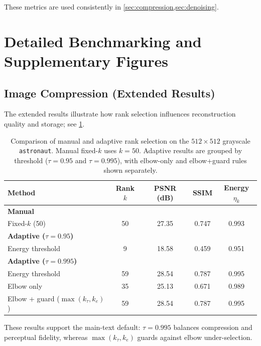 \documentclass[11pt,a4paper]{article}
\begin{document}
These metrics are used consistently in \cref{sec:compression,sec:denoising}.

\section{Detailed Benchmarking and Supplementary Figures}
\label{sec:appendix-bench}

\subsection{Image Compression (Extended Results)}
\label{sec:appendix-compression}

The extended results illustrate how rank selection influences reconstruction quality and storage; see \cref{tab:compression_summary}.



\begin{table}[t]
\centering
\caption{Comparison of manual and adaptive rank selection on the $512\times512$ grayscale \texttt{astronaut}. 
Manual fixed-$k$ uses $k=50$. 
Adaptive results are grouped by threshold ($\tau=0.95$ and $\tau=0.995$), with elbow-only and elbow+guard rules shown separately.}
\label{tab:compression_summary}
\begin{tabular}{lcccc}
\toprule
\textbf{Method} & \textbf{Rank $k$} & \textbf{PSNR (dB)} & \textbf{SSIM} & \textbf{Energy $\eta_k$} \\
\midrule
\multicolumn{5}{l}{\textbf{Manual}} \\
Fixed-$k$ (50)              & 50 & 27.35 & 0.747 & 0.993 \\
\midrule
\multicolumn{5}{l}{\textbf{Adaptive ($\tau = 0.95$)}} \\
Energy threshold             &  9 & 18.58 & 0.459 & 0.951 \\
\midrule
\multicolumn{5}{l}{\textbf{Adaptive ($\tau = 0.995$)}} \\
Energy threshold             & 59 & 28.54 & 0.787 & 0.995 \\
Elbow only                   & 35 & 25.13 & 0.671 & 0.989 \\
Elbow + guard ($\max(k_\tau,k_e)$) & 59 & 28.54 & 0.787 & 0.995 \\
\bottomrule
\end{tabular}
\end{table}

These results support the main-text default: \(\tau=0.995\) balances compression and perceptual fidelity, whereas \(\max(k_\tau,k_e)\) guards against elbow under-selection.
\end{document}
